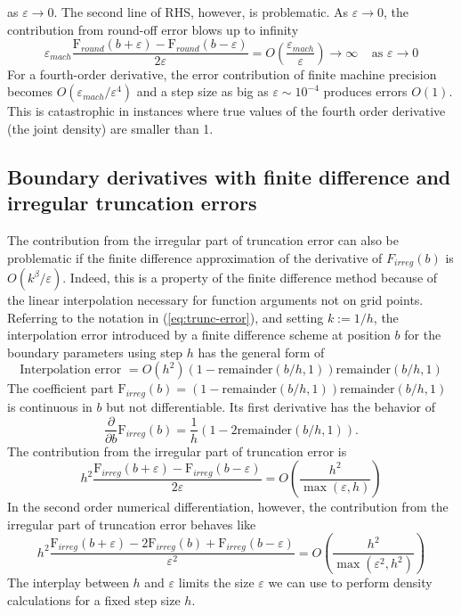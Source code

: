 as $\varepsilon \rightarrow 0$.  The second line of RHS, however, is
problematic. As $\varepsilon \rightarrow 0$, the contribution from
round-off error blows up to infinity
\[
  \varepsilon_{mach}
  \frac{\mbox{F}_{round}(b+\varepsilon)-\mbox{F}_{round}(b-\varepsilon)}{2
    \varepsilon} = O\left(\frac{\varepsilon_{mach}}{\varepsilon}
  \right) \longrightarrow \infty \;\;\;\; \mbox{as } \varepsilon
  \rightarrow 0
\]
For a fourth-order derivative, the error contribution of finite
machine precision becomes $O(\varepsilon_{mach}/\varepsilon^4)$ and a
step size as big as $\varepsilon \sim 10^{-4}$ produces errors
$O(1)$. This is catastrophic in instances where true values of the
fourth order derivative (the joint density) are smaller than 1.

\subsection{Boundary derivatives with finite difference and irregular truncation errors}
The contribution from the irregular part of truncation error can also
be problematic if the finite difference approximation of the
derivative of $F_{irreg}(b)$ is $O(k^\beta/\varepsilon)$. Indeed, this
is a property of the finite difference method because of the linear
interpolation necessary for function arguments not on grid
points. Referring to the notation in (\ref{eq:trunc-error}), and
setting $k := 1/h$, the interpolation error introduced by a finite
difference scheme at position $b$ for the boundary parameters using
step $h$ has the general form of
$$\mbox{Interpolation error } = O(h^2) (1-\mbox{remainder}(b/h,1)) \mbox{remainder}(b/h,1)$$
The coefficient part
$\mbox{F}_{irreg}(b) = (1-\mbox{remainder}(b/h,1)) \mbox{remainder}(b/h,1) $ is
continuous in $b$ but not differentiable. Its first derivative has the
behavior of
$$ \frac{\partial }{\partial b} \mbox{F}_{irreg}(b) =  \frac{1}{h} \left(1-2\mbox{remainder}(b/h,1) \right).$$ The contribution from the irregular part of truncation error is
$$ h^2 \frac{\mbox{F}_{irreg}(b+\varepsilon)-\mbox{F}_{irreg}(b-\varepsilon)}{2 \varepsilon}  =
O\left(\frac{h^2}{\max(\varepsilon, h)} \right) $$
In the second order numerical differentiation, however, the contribution from
the irregular part of truncation error behaves like
$$ h^2 \frac{\mbox{F}_{irreg}(b+\varepsilon)-2\mbox{F}_{irreg}(b)
  +\mbox{F}_{irreg}(b-\varepsilon)}{\varepsilon^2 } =
O\left(\frac{h^2}{\max(\varepsilon^2, h^2)} \right) $$ The interplay
between $h$ and $\varepsilon$ limits the size $\varepsilon$ we can use
to perform density calculations for a fixed step size $h$.

